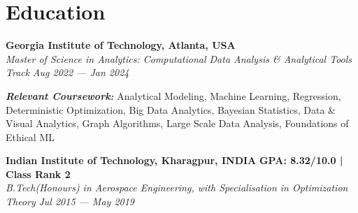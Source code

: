\documentclass[a4,10pt]{article}
\begin{document}
\vspace{-0.2cm}
\section{Education}
\vspace{-0.18cm} 
\item \begin{minipage}{\linewidth} \textbf{Georgia Institute of Technology, Atlanta, USA} \hfill\\
\textit{Master of Science in Analytics: Computational Data Analysis \& Analytical Tools Track}
\hfill {\textit{Aug 2022 --- Jan 2024}}
\item
\textit{\textbf{Relevant Coursework:}} Analytical Modeling, Machine Learning, Regression, Deterministic Optimization, Big Data Analytics, Bayesian Statistics, Data \& Visual Analytics, Graph Algorithms, Large Scale Data Analysis, Foundations of Ethical ML
\end{minipage}
\vspace{0.16cm} 
\item \begin{minipage}{\linewidth} \textbf{Indian Institute of Technology, Kharagpur, INDIA} \hfill \textbf{GPA: 8.32/10.0 | Class Rank 2} \\
\textit{B.Tech(Honours) in Aerospace Engineering, with Specialisation in Optimization Theory}
\hfill {\textit{Jul 2015 --- May 2019}}
\end{minipage}

\end{document}

